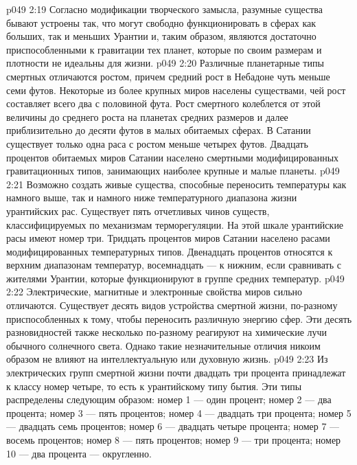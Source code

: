 \vs p049 2:19 \bibnobreakspace {} Согласно модификации творческого замысла, разумные существа бывают устроены так, что могут свободно функционировать в сферах как больших, так и меньших Урантии и, таким образом, являются достаточно приспособленными к гравитации тех планет, которые по своим размерам и плотности не идеальны для жизни.
\vs p049 2:20 Различные планетарные типы смертных отличаются ростом, причем средний рост в Небадоне чуть меньше семи футов. Некоторые из более крупных миров населены существами, чей рост составляет всего два с половиной фута. Рост смертного колеблется от этой величины до среднего роста на планетах средних размеров и далее приблизительно до десяти футов в малых обитаемых сферах. В Сатании существует только одна раса с ростом меньше четырех футов. Двадцать процентов обитаемых миров Сатании населено смертными модифицированных гравитационных типов, занимающих наиболее крупные и малые планеты.
\vs p049 2:21 \bibnobreakspace {} Возможно создать живые существа, способные переносить температуры как намного выше, так и намного ниже температурного диапазона жизни урантийских рас. Существует пять отчетливых чинов существ, классифицируемых по механизмам терморегуляции. На этой шкале урантийские расы имеют номер три. Тридцать процентов миров Сатании населено расами модифицированных температурных типов. Двенадцать процентов относятся к верхним диапазонам температур, восемнадцать --- к нижним, если сравнивать с жителями Урантии, которые функционируют в группе средних температур.
\vs p049 2:22 \bibnobreakspace {} Электрические, магнитные и электронные свойства миров сильно отличаются. Существует десять видов устройства смертной жизни, по\hyp{}разному приспособленных к тому, чтобы переносить различную энергию сфер. Эти десять разновидностей также несколько по\hyp{}разному реагируют на химические лучи обычного солнечного света. Однако такие незначительные отличия никоим образом не влияют на интеллектуальную или духовную жизнь.
\vs p049 2:23 Из электрических групп смертной жизни почти двадцать три процента принадлежат к классу номер четыре, то есть к урантийскому типу бытия. Эти типы распределены следующим образом: номер 1 --- один процент; номер 2 --- два процента; номер 3 --- пять процентов; номер 4 --- двадцать три процента; номер 5 --- двадцать семь процентов; номер 6 --- двадцать четыре процента; номер 7 --- восемь процентов; номер 8 --- пять процентов; номер 9 --- три процента; номер 10 --- два процента --- округленно.
